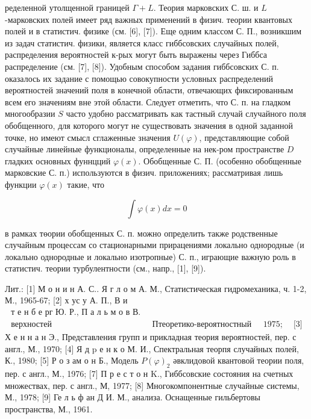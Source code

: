 \documentclass[10pt]{article}
\begin{document}
ределенной утолщенной границей $\Gamma+L$. Теория марковских С. ш. и $L$-марковских полей имеет ряд важных применений в физич. теории квантовых полей и в статистич. физике (см. [6], [7]). Еще одним классом С. П., возникшим из задач статистич. физики, является класс гиббсовских случайных полей, распределения вероятностей к-рых могут быть выражены через Гиббса распределение (см. [7], [8]). Удобным способом задания гиббсовских С. п. оказалось их задание с помощью совокупности условных распределений вероятностей значений поля в конечной области, отвечающих фиксированным всем его значениям вне этой области. Следует отметить, что С. п. на гладком многообразии $S$ часто удобно рассматривать как тастный случай случайного поля обобщенного, для которого могут не существовать значения в одной заданной точке, но имеют смысл сглаженные значения $U(\varphi)$, представляющие собой случайные линейные функционалы, определенные на нек-ром пространстве $D$ гладких основных фуннцций $\varphi(x)$. Обобщенные С. П. (особенно обобщенные марковские С. п.) используются в физич. приложениях; рассматривая лишь функции $\varphi(x)$ такие, что



\[

\int \varphi(x) d x=0

\]



в рамках төории обобщенных С. п. можно определить также родственные случайным процессам со стационарными прирацениями локально однородные (и локально однородные и локально изотропные) С. п., играющие важную роль в статистич. теории турбулентности (см., напр., [1], [9]).



Лит.: [1] М о н и н А. С.. Я г л о м А. М., Статистическая гидромеханика, ч. 1-2, М., 1965-67; [2] х ус у А. П., В и$\begin{array}{lllll}\text { т е н б е рг Ю. Р., П а л ь м о в В. А., Шероховатость } \\ \text { верхностей } & \text { Птеоретико-вероятностный подход), М., } & 1975 ; & \text { [3] }\end{array}$ Х е н н а н Э., Представления групп и прикладная теория вероятностей, пер. с англ., М., 1970; [4] Я д p е н к о М. И., Спектральная теорпя случайных полей, К., 1980; [5] Р о з ам о н Б., Модель $P(\varphi)_{2}$ әвклидовой квантовой теории поля, пер. с англ., М., 1976; [7] П р е с т о н $\mathrm{K}$., Гиббсовские состояния на счетных множествах, пер. с англ., М, 1977; [8] Многокомпонентные случайные системы, М., 1978; [9] Ге л ь ф ан Д И. М., анализа. Оснащенные гильбертовы пространства, М., 1961.
\end{document}
